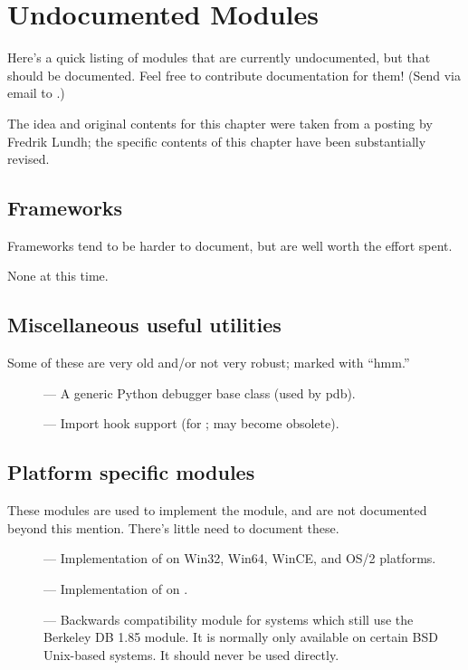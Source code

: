 \chapter{Undocumented Modules \label{undoc}}

Here's a quick listing of modules that are currently undocumented, but
that should be documented.  Feel free to contribute documentation for
them!  (Send via email to .)

The idea and original contents for this chapter were taken
from a posting by Fredrik Lundh; the specific contents of this chapter
have been substantially revised.


\section{Frameworks}

Frameworks tend to be harder to document, but are well worth the
effort spent.

\begin{description}
\item None at this time.
\end{description}


\section{Miscellaneous useful utilities}

Some of these are very old and/or not very robust; marked with ``hmm.''

\begin{description}
\item[]
--- A generic Python debugger base class (used by pdb).

\item[]
--- Import hook support (for ; may become obsolete).
\end{description}



\section{Platform specific modules}

These modules are used to implement the  module,
and are not documented beyond this mention.  There's little need to
document these.

\begin{description}
\item[]
--- Implementation of  on Win32, Win64, WinCE, and
    OS/2 platforms.

\item[]
--- Implementation of  on \POSIX.

\item[]
--- Backwards compatibility module for systems which still use the Berkeley
    DB 1.85 module.  It is normally only available on certain BSD Unix-based
    systems.  It should never be used directly.
\end{description}


